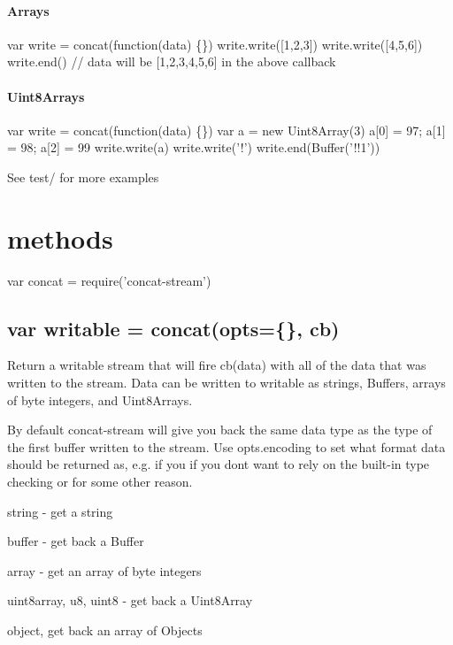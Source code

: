 \paragraph*{Arrays}


\begin{DoxyCode}
var write = concat(function(data) \{\})
write.write([1,2,3])
write.write([4,5,6])
write.end()
// data will be [1,2,3,4,5,6] in the above callback
\end{DoxyCode}


\paragraph*{Uint8\+Arrays}


\begin{DoxyCode}
var write = concat(function(data) \{\})
var a = new Uint8Array(3)
a[0] = 97; a[1] = 98; a[2] = 99
write.write(a)
write.write('!')
write.end(Buffer('!!1'))
\end{DoxyCode}


See {\ttfamily test/} for more examples

\section*{methods}


\begin{DoxyCode}
var concat = require('concat-stream')
\end{DoxyCode}


\subsection*{var writable = concat(opts=\{\}, cb)}

Return a {\ttfamily writable} stream that will fire {\ttfamily cb(data)} with all of the data that was written to the stream. Data can be written to {\ttfamily writable} as strings, Buffers, arrays of byte integers, and Uint8\+Arrays.

By default {\ttfamily concat-\/stream} will give you back the same data type as the type of the first buffer written to the stream. Use {\ttfamily opts.\+encoding} to set what format {\ttfamily data} should be returned as, e.\+g. if you if you don\textquotesingle{}t want to rely on the built-\/in type checking or for some other reason.


\begin{DoxyItemize}
\item {\ttfamily string} -\/ get a string
\item {\ttfamily buffer} -\/ get back a Buffer
\item {\ttfamily array} -\/ get an array of byte integers
\item {\ttfamily uint8array}, {\ttfamily u8}, {\ttfamily uint8} -\/ get back a Uint8\+Array
\item {\ttfamily object}, get back an array of Objects
\end{DoxyItemize}

